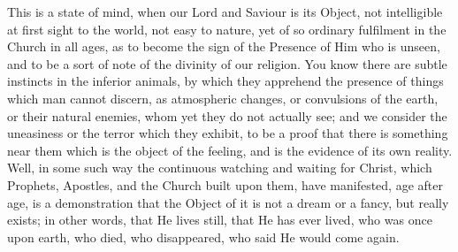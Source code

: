 This is a state of mind, when our Lord and Saviour is
its Object, not intelligible at first sight to the world,
not easy to nature, yet of so ordinary fulfilment in the
Church in all ages, as to become the sign of the Presence
of Him who is unseen, and to be a sort of note of the
divinity of our religion. You know there are subtle
instincts in the inferior animals, by which they
apprehend the presence of things which man cannot
discern, as atmospheric changes, or convulsions of the
earth, or their natural enemies, whom yet they do not
actually see; and we consider the uneasiness or the
terror which they exhibit, to be a proof that there is
something near them which is the object of the feeling,
and is the evidence of its own reality. Well, in some
such way the continuous watching and waiting for Christ,
which Prophets, Apostles, and the Church built upon them,
have manifested, age after age, is a demonstration that
the Object of it is not a dream or a fancy, but really
exists; in other words, that He lives still, that He has
ever lived, who was once upon earth, who died, who
disappeared, who said He would come again.

